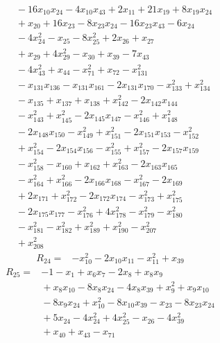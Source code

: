 {\begin{align*}
&{}  - 16x_{10} x_{24} - 4x_{10} x_{43} + 2x_{11} + 21x_{19} + 8x_{19} x_{24} \\
&{}  + x_{20} + 16x_{23} - 8x_{23} x_{24} - 16x_{23} x_{43} - 6x_{24} \\
&{}  - 4x_{24}^{2} - x_{25} - 8x_{25}^{2} + 2x_{26} + x_{27} \\
&{}  + x_{29} + 4x_{29}^{2} - x_{30} + x_{39} - 7x_{43} \\
&{}  - 4x_{43}^{2} + x_{44} - x_{71}^{2} + x_{72} - x_{131}^{2} \\
&{}  - x_{131} x_{136} - x_{131} x_{161} - 2x_{131} x_{170} - x_{133}^{2} + x_{134}^{2} \\
&{}  - x_{135} + x_{137} + x_{138} + x_{142}^{2} - 2x_{142} x_{144} \\
&{}  - x_{143}^{2} + x_{145}^{2} - 2x_{145} x_{147} - x_{146}^{2} + x_{148}^{2} \\
&{}  - 2x_{148} x_{150} - x_{149}^{2} + x_{151}^{2} - 2x_{151} x_{153} - x_{152}^{2} \\
&{}  + x_{154}^{2} - 2x_{154} x_{156} - x_{155}^{2} + x_{157}^{2} - 2x_{157} x_{159} \\
&{}  - x_{158}^{2} - x_{160} + x_{162} + x_{163}^{2} - 2x_{163} x_{165} \\
&{}  - x_{164}^{2} + x_{166}^{2} - 2x_{166} x_{168} - x_{167}^{2} - 2x_{169} \\
&{}  + 2x_{171} + x_{172}^{2} - 2x_{172} x_{174} - x_{173}^{2} + x_{175}^{2} \\
&{}  - 2x_{175} x_{177} - x_{176}^{2} + 4x_{178}^{2} - x_{179}^{2} - x_{180}^{2} \\
&{}  - x_{181}^{2} - x_{182}^{2} + x_{189}^{2} + x_{190}^{2} - x_{207}^{2} \\
&{}  + x_{208}^{2}
\end{align*}
\begin{align*}
R_{24} ={}& -x_{10}^{2} - 2x_{10} x_{11} - x_{11}^{2} + x_{39}
\end{align*}
\begin{align*}
R_{25} ={}& -1 - x_{1} + x_{6} x_{7} - 2x_{8} + x_{8} x_{9} \\
&{}  + x_{8} x_{10} - 8x_{8} x_{24} - 4x_{8} x_{39} + x_{9}^{2} + x_{9} x_{10} \\
&{}  - 8x_{9} x_{24} + x_{10}^{2} - 8x_{10} x_{39} - x_{23} - 8x_{23} x_{24} \\
&{}  + 5x_{24} - 4x_{24}^{2} + 4x_{25}^{2} - x_{26} - 4x_{39}^{2} \\
&{}  + x_{40} + x_{43} - x_{71}

\end{align*}}
